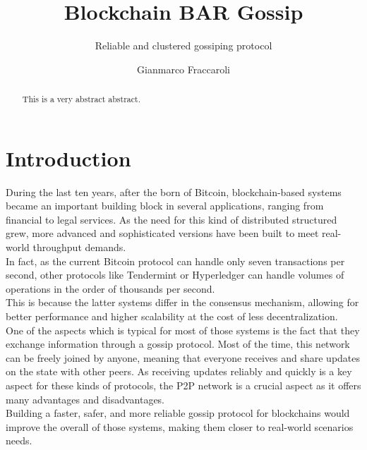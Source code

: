 \documentclass[mscthesis]{usiinfthesis}
\title{Blockchain BAR Gossip} %
\subtitle{Reliable and clustered gossiping protocol} %
\author{Gianmarco Fraccaroli} %
\begin{document}
\maketitle %

\frontmatter %

\begin{abstract}
This is a very abstract abstract. 
\end{abstract}



\begin{acknowledgements}
\end{acknowledgements}

\tableofcontents 
\listoffigures 
\listoftables %

\mainmatter

\chapter{Introduction}
During the last ten years, after the born of Bitcoin, blockchain-based systems became an important building block in several applications, ranging from financial to legal services. As the need for this kind of distributed structured grew, more advanced and sophisticated versions have been built to meet real-world throughput demands. \\
In fact, as the current Bitcoin protocol can handle only seven transactions per second, other protocols like Tendermint or Hyperledger can handle volumes of operations in the order of thousands per second. \\
This is because the latter systems differ in the consensus mechanism, allowing for better performance and higher scalability at the cost of less decentralization. \\
One of the aspects which is typical for most of those systems is the fact that they exchange information through a gossip protocol. Most of the time, this network can be freely joined by anyone, meaning that everyone receives and share updates on the state with other peers. 
As receiving updates reliably and quickly is a key aspect for these kinds of protocols, the P2P network is a crucial aspect as it offers many advantages and disadvantages. \\
Building a faster, safer, and more reliable gossip protocol for blockchains would improve the overall of those systems, making them closer to real-world scenarios needs.
\end{document}
